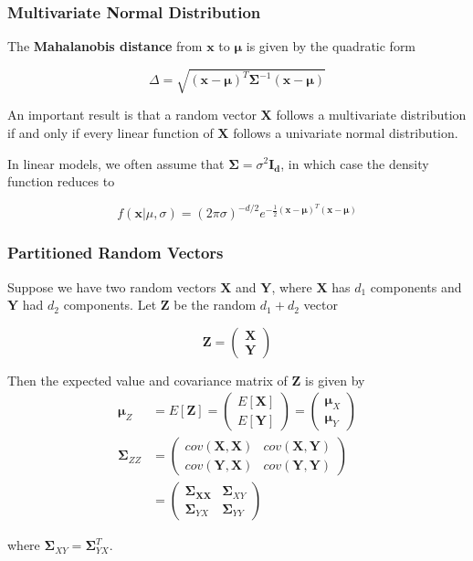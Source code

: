 \documentclass{beamer}
\begin{document}
\begin{frame}
\frametitle{Multivariate Normal Distribution}
The \textbf{Mahalanobis distance} from $\mathbf{x}$ to $\mathbf{\mu}$ is given by the quadratic form

$$\Delta = \sqrt{(\mathbf{x} - \mathbf{\mu})^T \mathbf{\Sigma}^{-1}(\mathbf{x} - \mathbf{\mu})}$$

An important result is that a random vector $\mathbf{X}$ follows a multivariate distribution if and only if every linear function of $\mathbf{X}$ follows a univariate normal distribution.
\vspace{5mm}

In linear models, we often assume that $\mathbf{\Sigma} = \sigma^2\mathbf{I_d}$, in which case the density function reduces to

$$f(\mathbf{x}|\mu, \sigma) = (2\pi \sigma)^{-d/2} e^{-\frac{1}{2} (\mathbf{x} - \mathbf{\mu})^T (\mathbf{x} - \mathbf{\mu})}$$
\end{frame}

\begin{frame}
\frametitle{Partitioned Random Vectors}
Suppose we have two random vectors $\mathbf{X}$ and $\mathbf{Y}$, where $\mathbf{X}$ has $d_1$ components and $\mathbf{Y}$ had $d_2$ components.  Let $\mathbf{Z}$ be the random $d_1 + d_2$ vector

$$\mathbf{Z} = \begin{pmatrix} \mathbf{X} \\ \mathbf{Y} \end{pmatrix}$$

Then the expected value and covariance matrix of $\mathbf{Z}$ is given by 
\begin{align*}
\mathbf{\mu}_Z &= E[\mathbf{Z}] = \begin{pmatrix} E[\mathbf{X}] \\ E[\mathbf{Y}] \end{pmatrix} = \begin{pmatrix} \mathbf{\mu}_X \\ \mathbf{\mu}_Y \end{pmatrix}\\
\mathbf{\Sigma}_{ZZ} &= \begin{pmatrix} cov(\mathbf{X}, \mathbf{X}) & cov(\mathbf{X}, \mathbf{Y}) \\ cov(\mathbf{Y}, \mathbf{X}) & cov(\mathbf{Y}, \mathbf{Y})  \end{pmatrix}\\
&= \begin{pmatrix}
\mathbf{\Sigma_{XX}} & \mathbf{\Sigma}_{XY}\\
\mathbf{\Sigma}_{YX} & \mathbf{\Sigma}_{YY}
\end{pmatrix}
\end{align*}

where $\mathbf{\Sigma}_{XY} = \mathbf{\Sigma}_{YX}^T$. 
\end{frame}
\end{document}
